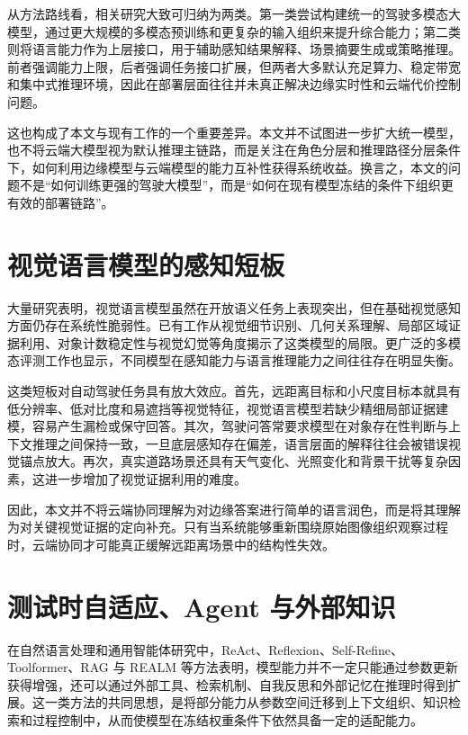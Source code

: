 从方法路线看，相关研究大致可归纳为两类。第一类尝试构建统一的驾驶多模态大模型，通过更大规模的多模态预训练和更复杂的输入组织来提升综合能力；第二类则将语言能力作为上层接口，用于辅助感知结果解释、场景摘要生成或策略推理。前者强调能力上限，后者强调任务接口扩展，但两者大多默认充足算力、稳定带宽和集中式推理环境，因此在部署层面往往并未真正解决边缘实时性和云端代价控制问题。

这也构成了本文与现有工作的一个重要差异。本文并不试图进一步扩大统一模型，也不将云端大模型视为默认推理主链路，而是关注在角色分层和推理路径分层条件下，如何利用边缘模型与云端模型的能力互补性获得系统收益。换言之，本文的问题不是“如何训练更强的驾驶大模型”，而是“如何在现有模型冻结的条件下组织更有效的部署链路”。

\section{视觉语言模型的感知短板}
\label{sec:related-visualgap}

大量研究表明，视觉语言模型虽然在开放语义任务上表现突出，但在基础视觉感知方面仍存在系统性脆弱性。已有工作从视觉细节识别、几何关系理解、局部区域证据利用、对象计数稳定性与视觉幻觉等角度揭示了这类模型的局限\cite{rahmanzadehgervi2024vlmsblind,tong2024eyeswideshut,gou2024imagedetails,kamoi2024visonlyqa,kaduri2025whatsintheimage,guan2024hallusionbench}。更广泛的多模态评测工作也显示，不同模型在感知能力与语言推理能力之间往往存在明显失衡\cite{liu2024mmbench,yue2024mmmu,duan2024vlmevalkit}。

这类短板对自动驾驶任务具有放大效应。首先，远距离目标和小尺度目标本就具有低分辨率、低对比度和易遮挡等视觉特征，视觉语言模型若缺少精细局部证据建模，容易产生漏检或保守回答。其次，驾驶问答常要求模型在对象存在性判断与上下文推理之间保持一致，一旦底层感知存在偏差，语言层面的解释往往会被错误视觉锚点放大。再次，真实道路场景还具有天气变化、光照变化和背景干扰等复杂因素，这进一步增加了视觉证据利用的难度。

因此，本文并不将云端协同理解为对边缘答案进行简单的语言润色，而是将其理解为对关键视觉证据的定向补充。只有当系统能够重新围绕原始图像组织观察过程时，云端协同才可能真正缓解远距离场景中的结构性失效。

\section{测试时自适应、Agent 与外部知识}
\label{sec:related-agent}

在自然语言处理和通用智能体研究中，ReAct、Reflexion、Self-Refine、Toolformer、RAG 与 REALM 等方法表明，模型能力并不一定只能通过参数更新获得增强，还可以通过外部工具、检索机制、自我反思和外部记忆在推理时得到扩展\cite{yao2023react,shinn2023reflexion,madaan2023selfrefine,schick2023toolformer,lewis2020rag,guu2020realm,wei2022cot}。这一类方法的共同思想，是将部分能力从参数空间迁移到上下文组织、知识检索和过程控制中，从而使模型在冻结权重条件下依然具备一定的适配能力。

